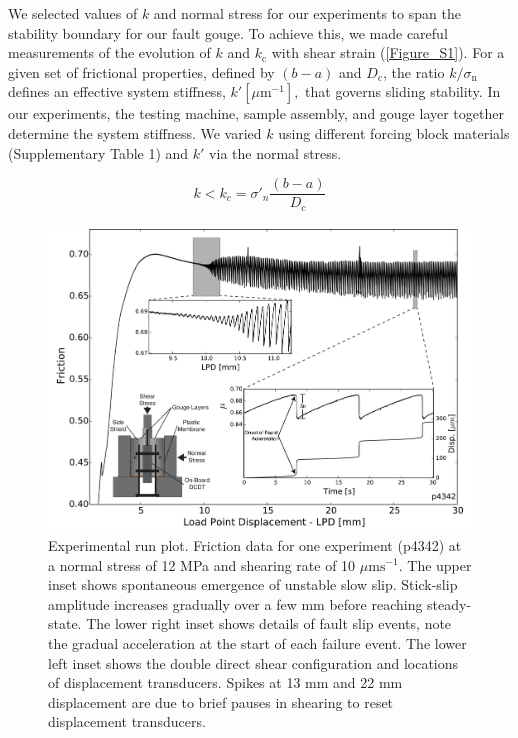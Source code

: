 We selected values of $k$ and normal stress for our experiments to span the stability boundary for our fault gouge.  To achieve this, we made careful measurements of the evolution of $k$ and $k_\text{c}$ with shear strain (\ref{Figure_S1}). For a given set of frictional properties, defined by $(b-a)$ and $D_\text{c}$, the ratio $k/\sigma_\text{n} $ defines an effective system stiffness, $k' [\mu \text{m}^{-1}],$ that governs sliding stability. In our experiments, the testing machine, sample assembly, and gouge layer together determine the system stiffness. We varied $k$ using different forcing block materials (Supplementary Table 1) and $k'$ via the normal stress.  

\begin{equation}
	k<k_c = \sigma'_n \frac{(b-a)}{D_c}
	\label{eq_1}
\end{equation}
\begin{figure}
	\centering
		\includegraphics[scale=0.5]{chap_lab_slow_eq/Figure_1.pdf}
   	\caption{Experimental run plot. Friction data for one experiment (p4342) at a normal stress of 12 MPa and shearing rate of 10 $\mu \text{ms}^{-1}$. The upper inset shows spontaneous emergence of unstable slow slip. Stick-slip amplitude increases gradually over a few mm before reaching steady-state.  The lower right inset shows details of fault slip events, note the gradual acceleration at the start of each failure event. The lower left inset shows the double direct shear configuration and locations of displacement transducers. Spikes at 13 mm and 22 mm displacement are due to brief pauses in shearing to reset displacement transducers.}
  	\label{Figure_1}
\end{figure}

